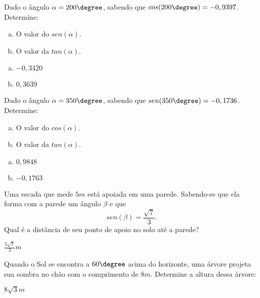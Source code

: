  \begin{exer}
 Dado o ângulo $\alpha= 200\degree$, sabendo que $cos(200\degree)= -0,9397$. Determine:
 \begin{enumerate}[a)]
 \item O valor do $sen(\alpha)$.
 \item O valor da $tan(\alpha)$.
 \end{enumerate}
 \end{exer}
\begin{resp}
 \begin{multicols}{2}
  \begin{enumerate}[a)]
 \item $-0,3420$
 \item $0,3639$
 \end{enumerate}
 \end{multicols}
\end{resp}

 \begin{exer}
 Dado o ângulo $\alpha= 350\degree$, sabendo que $sen(350\degree)= -0,1736$. Determine:
 \begin{enumerate}[a)]
 \item O valor do $cos(\alpha)$.
 \item O valor da $tan(\alpha)$.
 \end{enumerate}
 \end{exer}
\begin{resp}
  \begin{multicols}{2}
  \begin{enumerate}[a)]
 \item $0,9848$
 \item $-0,1763$
 \end{enumerate}
 \end{multicols}
\end{resp}

 \begin{exer}
 Uma escada que mede $5m$ está apoiada em uma parede. Sabendo-se que ela forma com a parede um ângulo $\beta$ e que
\begin{equation}
sen(\beta)=\frac{\sqrt{7}}{3}.
\end{equation}
Qual é a distância de seu ponto de apoio no solo até a parede?
 \end{exer}
\begin{resp}
 $\frac{5\sqrt{7}}{3} m$
\end{resp}

 \begin{exer}
 Quando o Sol se encontra a $60\degree$ acima do horizonte, uma árvore projeta sua sombra no chão com o comprimento de $8 m$. Determine a altura dessa árvore:
 \end{exer}
\begin{resp}
  $8\sqrt{3} m$
\end{resp}

